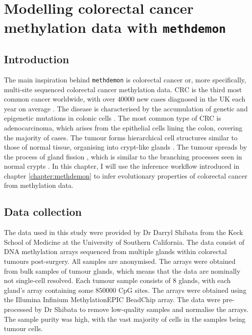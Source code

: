 \chapter{Modelling colorectal cancer methylation data with \texttt{methdemon}}
\label{chapter:methylation}

\section{Introduction}
The main inspiration behind \texttt{methdemon} is colorectal cancer or, more
specifically, multi-site sequenced colorectal cancer methylation data. CRC is
the third most common cancer worldwide, with over $40000$ new cases diagnosed
in the UK each year on average \cite{cancer_research_uk_bowel_2021}. The
disease is characterised by the accumulation of genetic and epigenetic
mutations in colonic cells \cite{fleming_colorectal_2012}. The most common type
of CRC is adenocarcinoma, which arises from the epithelial cells lining the
colon, covering the majority of cases. The tumour forms hierarchical cell
structures similar to those of normal tissue, organising into crypt-like glands
\cite{ponz_de_leon_pathology_2001}. The tumour spreads by the process of gland
fission \cite{preston_bottom-up_nodate}, which is similar to the branching
processes seen in normal crypts \cite{almet_multicellular_2018}. In this
chapter, I will use the inference workflow introduced in chapter
\ref{chapter:methdemon} to infer evolutionary properties of colorectal cancer
from methylation data.

\section{Data collection}
The data used in this study were provided by Dr Darryl Shibata from the Keck
School of Medicine at the University of Southern California. The data consist
of DNA methylation arrays sequenced from multiple glands within colorectal
tumours post-surgery. All samples are anonymised. The arrays were obtained from
bulk samples of tumour glands, which means that the data are nominally not
single-cell resolved. Each tumour sample consists of $8$ glands, with each
gland's array containing some $850000$ CpG sites. The arrays were obtained
using the Illumina Infinium MethylationEPIC BeadChip array. The data were
pre-processed by Dr Shibata to remove low-quality samples and normalise the
arrays. The sample purity was high, with the vast majority of cells in the
samples being tumour cells.

